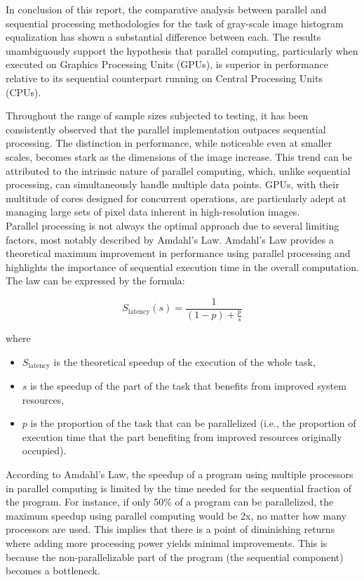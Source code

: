 \documentclass[10pt]{article}
\begin{document}
In conclusion of this report, the comparative analysis between parallel and sequential processing methodologies for the task of gray-scale image histogram equalization has shown a substantial difference between each. The results unambiguously support the hypothesis that parallel computing, particularly when executed on Graphics Processing Units (GPUs), is superior in performance relative to its sequential counterpart running on Central Processing Units (CPUs).

Throughout the range of sample sizes subjected to testing, it has been consistently observed that the parallel implementation outpaces sequential processing. The distinction in performance, while noticeable even at smaller scales, becomes stark as the dimensions of the image increase. This trend can be attributed to the intrinsic nature of parallel computing, which, unlike sequential processing, can simultaneously handle multiple data points. GPUs, with their multitude of cores designed for concurrent operations, are particularly adept at managing large sets of pixel data inherent in high-resolution images. \\
Parallel processing is not always the optimal approach due to several limiting factors, most notably described by Amdahl's Law. Amdahl's Law provides a theoretical maximum improvement in performance using parallel processing and highlights the importance of sequential execution time in the overall computation. The law can be expressed by the formula:


\begin{equation}
S_{\text{latency}}(s) = \frac{1}{(1 - p) + \frac{p}{s}}
\end{equation}

where
\begin{itemize}
\item \( S_{\text{latency}} \) is the theoretical speedup of the execution of the whole task,
\item \( s \) is the speedup of the part of the task that benefits from improved system resources,
\item \( p \) is the proportion of the task that can be parallelized (i.e., the proportion of execution time that the part benefiting from improved resources originally occupied).
\end{itemize}

\vspace{1cm}

According to Amdahl's Law, the speedup of a program using multiple processors in parallel computing is limited by the time needed for the sequential fraction of the program. For instance, if only 50\% of a program can be parallelized, the maximum speedup using parallel computing would be 2x, no matter how many processors are used. This implies that there is a point of diminishing returns where adding more processing power yields minimal improvements. This is because the non-parallelizable part of the program (the sequential component) becomes a bottleneck.
\end{document}
